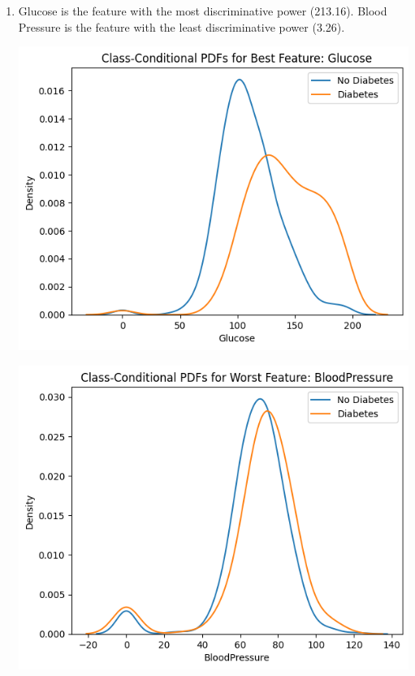 \documentclass{article}
\begin{document}
\begin{enumerate}[leftmargin=\labelsep]
\item Glucose is the feature with the most discriminative power (213.16).
Blood Pressure is the feature with the least discriminative power (3.26).
\begin{center}
    \begin{minipage}[t]{0.45\textwidth}
        \centering
        \includegraphics[width=\textwidth]{img/best_disc_feature.png} 
    \end{minipage}
    \hfill
    \begin{minipage}[t]{0.45\textwidth}
        \centering
        \includegraphics[width=\textwidth]{img/worst_dict_feature.png} 
    \end{minipage}
\end{center}


\end{enumerate}
\end{document}
